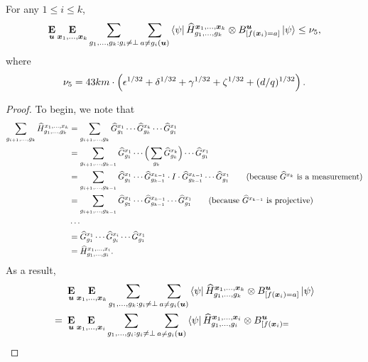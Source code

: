 \begin{lemma}
\label{lem:ld-sandwich-line-one-point}
For any $1 \leq i \leq k$,
\begin{equation*}
\mathop{\bf E\/}_{\boldsymbol{u}}  \mathop{\bf E\/}_{{\boldsymbol{x}}_1, \dots, {\boldsymbol{x}}_k} \sum_{g_1, \dots, g_k: g_i \neq \bot}  \sum_{a \neq
    g_i(\boldsymbol{u})} \bra{\psi}
  \widehat{H}^{{\boldsymbol{x}}_1, \dots, {\boldsymbol{x}}_k}_{g_1, \dots, g_k} \otimes B^{\boldsymbol{u}}_{[f({\boldsymbol{x}}_i) =
    a]} \ket{\psi}  \leq \nu_5,
 \end{equation*}
where
\begin{equation*}
    \nu_5 = 43 km \cdot \left(\epsilon^{1/32} + \delta^{1/32} + \gamma^{1/32} + \zeta^{1/32} + (d/q)^{1/32}\right).
\end{equation*}
\end{lemma}
\begin{proof}
To begin, we note that
\begin{align*}
\sum_{g_{i+1}, \ldots, g_k} \widehat{H}^{x_1, \ldots, x_k}_{g_1, \ldots, g_k}
& = \sum_{g_{i+1}, \ldots, g_k} \widehat{G}^{x_1}_{g_1} \cdots \widehat{G}^{x_k}_{g_k} \cdots \widehat{G}^{x_1}_{g_1}\\
& = \sum_{g_{i+1}, \ldots, g_{k-1}} \widehat{G}^{x_1}_{g_1} \cdots \Big(\sum_{g_k} \widehat{G}^{x_k}_{g_k} \Big)\cdots \widehat{G}^{x_1}_{g_1}\\
& = \sum_{g_{i+1}, \ldots, g_{k-1}} \widehat{G}^{x_1}_{g_1} \cdots \widehat{G}^{x_{k-1}}_{g_{k-1}} \cdot I \cdot \widehat{G}^{x_{k-1}}_{g_{k-1}}\cdots \widehat{G}^{x_1}_{g_1} \tag{because $\widehat{G}^{x_k}$ is a measurement}\\
& = \sum_{g_{i+1}, \ldots, g_{k-1}} \widehat{G}^{x_1}_{g_1} \cdots \widehat{G}^{x_{k-1}}_{g_{k-1}} \cdots \widehat{G}^{x_1}_{g_1} \tag{because $\widehat{G}^{x_{k-1}}$ is projective}\\
& \cdots \\
& = \widehat{G}^{x_1}_{g_1} \cdots \widehat{G}^{x_{i}}_{g_{i}} \cdots \widehat{G}^{x_1}_{g_1}\\
& = \widehat{H}^{x_1, \ldots, x_i}_{g_1, \ldots, g_i}.
\end{align*}
As a result,
\begin{align}
&\mathop{\bf E\/}_{\boldsymbol{u}}  \mathop{\bf E\/}_{{\boldsymbol{x}}_1, \dots, {\boldsymbol{x}}_k} \sum_{g_1, \dots, g_k: g_i \neq \bot}  \sum_{a \neq
    g_i(\boldsymbol{u})} \bra{\psi}
  \widehat{H}^{{\boldsymbol{x}}_1, \dots, {\boldsymbol{x}}_k}_{g_1, \dots, g_k} \otimes B^{\boldsymbol{u}}_{[f({\boldsymbol{x}}_i) =
    a]} \ket{\psi}\nonumber\\
=~&\mathop{\bf E\/}_{\boldsymbol{u}}  \mathop{\bf E\/}_{{\boldsymbol{x}}_1, \dots, {\boldsymbol{x}}_i} \sum_{g_1, \dots, g_i: g_i \neq \bot}  \sum_{a \neq
    g_i(\boldsymbol{u})} \bra{\psi}
  \widehat{H}^{{\boldsymbol{x}}_1, \dots, {\boldsymbol{x}}_i}_{g_1, \dots, g_i} \otimes B^{\boldsymbol{u}}_{[f({\boldsymbol{x}}_i) =
}
\end{align}
\end{proof}
